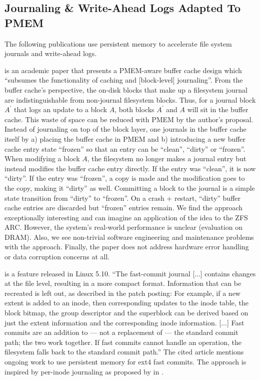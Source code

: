 \documentclass[12pt,a4paper,twoside]{book}
\begin{document}
\subsection{Journaling \& Write-Ahead Logs Adapted To PMEM}\label{sec:relwork:journalingandwals_adapted_to_pmem}
The following publications use persistent memory to accelerate file system journals and write-ahead logs.

 is an academic paper that presents a PMEM-aware buffer cache design which
“subsumes the functionality of caching and [block-level] journaling”.
From the buffer cache’s perspective, the on-disk blocks that make up a filesystem journal are indistinguishable from non-journal filesystem blocks.
Thus, for a journal block $A^\prime$ that logs an update to a block $A$, both blocks $A^\prime$ and $A$ will sit in the buffer cache.
This waste of space can be reduced with PMEM by the author’s proposal.
Instead of journaling on top of the block layer, one journals in the buffer cache itself by a) placing the buffer cache in PMEM and b) introducing a new buffer cache entry state “frozen” so that an entry can be “clean”, “dirty” or “frozen”.
When modifying a block $A$, the filesystem no longer makes a journal entry but instead modifies the buffer cache entry directly.
If the entry was “clean”, it is now “dirty”. If the entry was “frozen”, a copy is made and the modification goes to the copy, making it “dirty” as well.
Committing a block to the journal is a simple state transition from “dirty” to “frozen”. On a crash + restart, “dirty” buffer cache entries are discarded but “frozen” entries remain.
We find the approach exceptionally interesting and can imagine an application of the idea to the ZFS ARC.
However, the system’s real-world performance is unclear (evaluation on DRAM).
Also, we see non-trivial software engineering and maintenance problems with the approach.
Finally, the paper does not address hardware error handling or data corruption concerns at all.

 is a feature released in Linux 5.10.
“The fast-commit journal [...] contains changes at the file level, resulting in a more compact format.
Information that can be recreated is left out, as described in the patch posting:
For example, if a new extent is added to an inode, then  corresponding updates to the inode table, the block bitmap, the group descriptor and the superblock can be derived based on just the extent information and the corresponding inode information.
    [...] Fast commits are an addition to — not a replacement of — the standard commit path; the two work together.
If fast commits cannot handle an operation, the filesystem falls back to the standard commit path.”
The cited article mentions ongoing work to use persistent memory for ext4 fast commits.
The approach is inspired by per-inode journaling as proposed by \citeauthor{parkIJournalingFinegrainedJournaling2017} in \cite{parkIJournalingFinegrainedJournaling2017}.
\end{document}
